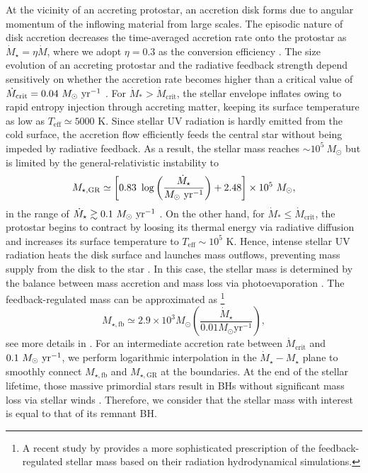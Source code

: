\documentclass[twocolumn, twocolappendix]{aastex63}
\newcommand{\Msun}{M_\odot}
\newcommand{\Msunyr}{M_\odot~{\rm yr}^{-1}}
\newcommand{\Mdot}{\dot{M}}
\newcommand{\blue}[1]{\textcolor{blue}{ #1}}
\begin{document}
\begin{CJK*}{UTF8}{gbsn}
At the vicinity of an accreting protostar, an accretion disk forms due to angular momentum of the inflowing material from large scales. 
The episodic nature of disk accretion decreases the time-averaged accretion rate onto the protostar as $\Mdot_{\star}=\eta \Mdot$, 
where we adopt $\eta=0.3$ as the conversion efficiency \citep{2016MNRAS.459.1137S, 2022arXiv220614459T}. 
The size evolution of an accreting protostar and the radiative feedback strength depend sensitively on whether
the accretion rate becomes higher than a critical value of $\dot{M}_{\mathrm{crit}}=0.04~\Msunyr$ 
\citep{2001ApJ...561L..55O,2013ApJ...778..178H,2013A&A...558A..59S,2015MNRAS.452..755S,2018MNRAS.474.2757H}.
For $\dot{M}_\ast > \Mdot_\mathrm{crit}$, the stellar envelope inflates owing to rapid entropy injection through accreting matter,
keeping its surface temperature as low as $T_\mathrm{eff} \simeq 5000$ K. 
Since stellar UV radiation is hardly emitted from the cold surface, the accretion flow efficiently feeds the central star without being 
impeded by radiative feedback.
As a result, the stellar mass reaches $\sim 10^5~\Msun$ but is limited by the general-relativistic instability to
%
\begin{equation}
 M_{\star, \mathrm{GR}} \simeq\left[0.83~\log \left(\frac{\dot{M}_{\star}}{\Msunyr}\right)+2.48\right] \times 10^{5} ~\Msun,
\end{equation}
%
in the range of $\dot{M}_\star\gtrsim 0.1~\Msunyr$ \citep{2016PhRvD..94b1501S,2017ApJ...842L...6W,2019PASA...36...27W}.
On the other hand, for $\dot{M}_\ast \leq \Mdot_\mathrm{crit}$, the protostar begins to contract by loosing its thermal energy via radiative diffusion
and increases its surface temperature to $T_\mathrm{eff} \sim 10^5$ K.
Hence, intense stellar UV radiation heats the disk surface and launches mass outflows, preventing mass supply from the disk to the star
\citep{2008ApJ...681..771M,2011Sci...334.1250H}. 
In this case, the stellar mass is determined by the balance between mass accretion and mass loss via photoevaporation \citep{2013ApJ...773..155T}.
The feedback-regulated mass can be approximated as
\footnote[2]{A recent study by \citet{2022arXiv220614459T} provides a more sophisticated prescription of the feedback-regulated stellar mass based on their radiation hydrodynamical simulations.}
%
\begin{equation}
M_{\star, \mathrm{fb}} \simeq 2.9 \times 10^{3} \Msun\left(\frac{\dot{M}_{\star}}{0.01 M_{\odot} \mathrm{yr}^{-1}}\right),
\end{equation}
%
see more details in \cite{2021ApJ...917...60L}.
For an intermediate accretion rate between $\Mdot_\mathrm{crit}$ and $0.1~\Msunyr$, 
we perform logarithmic interpolation in the $\Mdot_\star - M_\star$ plane to smoothly connect 
$M_{\star, \mathrm{fb}}$ and $M_{\star, \mathrm{GR}}$ at the boundaries.
At the end of the stellar lifetime, those massive primordial stars result in BHs without significant mass loss 
via stellar winds \citep{2003ApJ...591..288H,2010ApJ...714.1217B,2015MNRAS.451.4086S}.
Therefore, we consider that the stellar mass with interest is equal to that of its remnant BH.



\end{CJK*}
\end{document}
